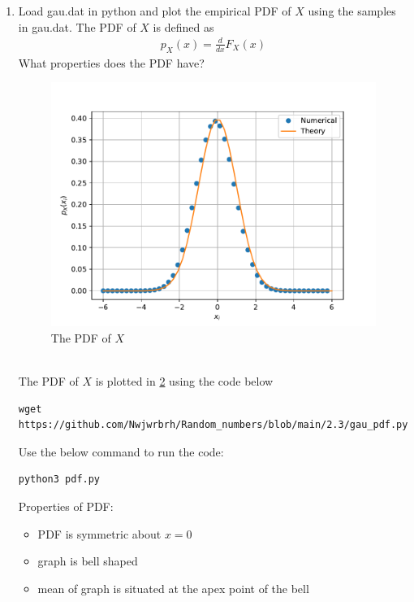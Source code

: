 \documentclass[journal,12pt,twocolumn]{IEEEtran}
\renewcommand\thesection{\arabic{section}}
\begin{document}
\begin{enumerate}[label=\thesection.\arabic*
,ref=\thesection.\theenumi]
\begin{figure}[h]
\caption{The CDF of $X$}
\label{fig:gau_cdf}
\end{figure}
\item
Load gau.dat in python and plot the empirical PDF of $X$ using the samples in gau.dat. The PDF of $X$ is defined as
\begin{align}
p_{X}(x) = \frac{d}{dx}F_{X}(x)
\end{align}
What properties does the PDF have?
\\
\begin{figure}[h]
\centering
\includegraphics[width=\columnwidth]{../2.3/gau_pdf}
\caption{The PDF of $X$}
\label{fig:gauss_pdf}
\end{figure}
\\
\solution The PDF of $X$ is plotted in \ref{fig:gauss_pdf} using the code below
\begin{lstlisting}
wget https://github.com/Nwjwrbrh/Random_numbers/blob/main/2.3/gau_pdf.py
\end{lstlisting}
Use the below command to run the code:
\begin{lstlisting}
python3 pdf.py
\end{lstlisting}
Properties of PDF:
\begin{itemize}
\item PDF is symmetric about $x=0$\\
\item graph is bell shaped\\
\item mean of graph is situated at the apex point of the bell\\
\end{itemize}

\end{enumerate}
\end{document}
